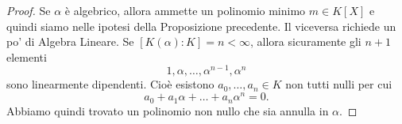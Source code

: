 \begin{proof}
Se \(\alpha\) è algebrico, allora ammette un polinomio minimo \(m \in K[X]\) e quindi siamo nelle ipotesi della Proposizione precedente. Il viceversa richiede un po' di Algebra Lineare. Se \([K(\alpha):K] = n < \infty\), allora sicuramente gli \(n+1\) elementi
\[1, \alpha, \dots{}, \alpha^{n-1}, \alpha^n\]
sono linearmente dipendenti. Cioè esistono \(a_0, \dots{}, a_n \in K\) non tutti nulli per cui
\[a_0 + a_1 \alpha + \dots{} + a_n \alpha^n = 0 .\]
Abbiamo quindi trovato un polinomio non nullo che sia annulla in \(\alpha\).  
\end{proof}


%
%
%
%


